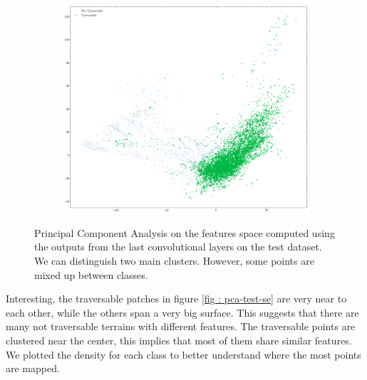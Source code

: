 \documentclass[../document.tex]{subfiles}
\begin{document}
\begin{figure} [htbp]
\begin{subfigure}[b]{0.48\textwidth}
    \end{subfigure}
    \begin{subfigure}[b]{0.48\textwidth}
        \includegraphics[width=\linewidth]{../img/5/pca/pca-test-1.png}
    \end{subfigure}
    \caption{Principal Component Analysis on the features space computed using the outputs from the last convolutional layers on the test dataset. We can distinguish two main clusters. However, some points are mixed up between classes.  }
    \label{fig : pca-test-set}
\end{figure}
Interesting, the traversable patches in figure \ref{fig : pca-test-se} are very near to each other, while the others span a very big surface. This suggests that there are many not traversable terrains with different features. The traversable points are clustered near the center, this implies that most of them share similar features. We plotted the density for each class to better understand where the most points are mapped.
\end{document}

